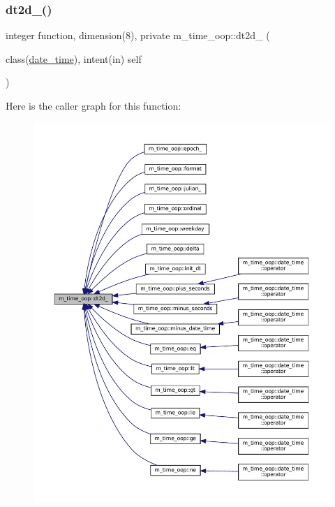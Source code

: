 \subsubsection{\texorpdfstring{dt2d\+\_\+()}{dt2d\_()}}
{\footnotesize\ttfamily integer function, dimension(8), private m\+\_\+time\+\_\+oop\+::dt2d\+\_\+ (\begin{DoxyParamCaption}\item[{class(\mbox{\hyperlink{structm__time__oop_1_1date__time}{date\+\_\+time}}), intent(in)}]{self }\end{DoxyParamCaption})\hspace{0.3cm}{\ttfamily [private]}}

Here is the caller graph for this function\+:\nopagebreak
\begin{figure}[H]
\begin{center}
\leavevmode
\includegraphics[width=350pt]{namespacem__time__oop_a93bafde872994fe68136d83195400e11_icgraph}
\end{center}
\end{figure}
\mbox{\label{namespacem__time__oop_ab4cc90bb587c2d3c2819bffc8f92cb59}} 
